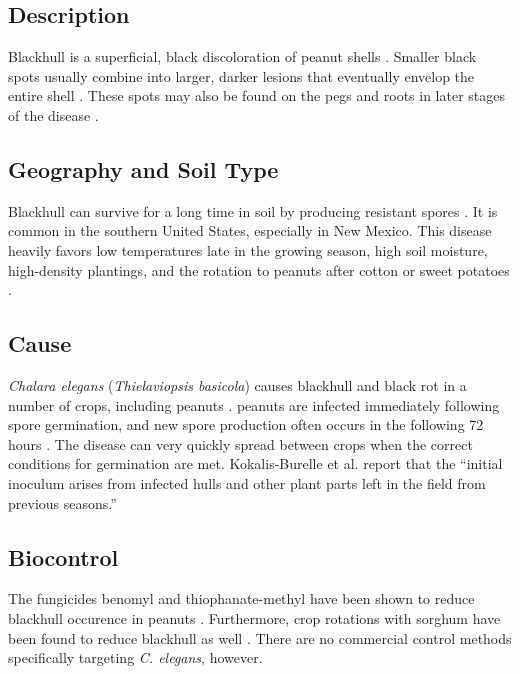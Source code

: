 \documentclass[letterpaper, 12pt]{report}
\begin{document}
\subsection{Description}

Blackhull is a superficial, black discoloration of peanut shells \autocite{kokalis1997compendium}. Smaller black spots usually combine into larger, darker lesions that eventually envelop the entire shell \autocite{kokalis1997compendium}. These spots may also be found on the pegs and roots in later stages of the disease \autocite{kokalis1997compendium}.

\subsection{Geography and Soil Type}

Blackhull can survive for a long time in soil by producing resistant spores \autocite{damicone2014soilborne}. It is common in the southern United States, especially in New Mexico. This disease heavily favors low temperatures late in the growing season, high soil moisture, high-density plantings, and the rotation to peanuts after cotton or sweet potatoes \autocite{kokalis1997compendium}.

\subsection{Cause}

\emph{Chalara elegans} (\emph{Thielaviopsis basicola}) causes blackhull and black rot in a number of crops, including peanuts \autocite{kokalis1997compendium}. peanuts are infected immediately following spore germination, and new spore production often occurs in the following 72 hours \autocite{kokalis1997compendium}. The disease can very quickly spread between crops when the correct conditions for germination are met. Kokalis-Burelle et al. report that the ``initial inoculum arises from infected hulls and other plant parts left in the field from previous seasons.''

\subsection{Biocontrol}

The fungicides benomyl and thiophanate-methyl have been shown to reduce blackhull occurence in peanuts \autocite{kokalis1997compendium}. Furthermore, crop rotations with sorghum have been found to reduce blackhull as well \autocite{damicone2014soilborne}. There are no commercial control methods specifically targeting \emph{C. elegans}, however.
\end{document}

